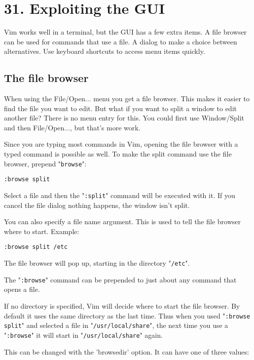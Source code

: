 \section{31. Exploiting the GUI}
Vim works well in a terminal, but the GUI has a few extra items.  A file
browser can be used for commands that use a file.  A dialog to make a choice
between alternatives.  Use keyboard shortcuts to access menu items quickly.
\subsection{The file browser}
When using the File/Open... menu you get a file browser.
This makes it easier to find the file you want to edit.
But what if you want to split a window to edit another file?  There is no menu entry for this.
You could first use Window/Split and then File/Open..., but that's more work.

Since you are typing most commands in Vim, opening the file browser with a typed command is possible as well.
To make the split command use the file browser, prepend "\verb!browse!":

\begin{Verbatim}[samepage=true]
 :browse split
\end{Verbatim}

Select a file and then the "\verb!:split!" command will be executed with it.
If you cancel the file dialog nothing happens, the window isn't split.

You can also specify a file name argument.
This is used to tell the file browser where to start.
Example:

\begin{Verbatim}[samepage=true]
 :browse split /etc
\end{Verbatim}

The file browser will pop up, starting in the directory "\verb!/etc!".

The "\verb!:browse!" command can be prepended to just about any command that opens a file.

If no directory is specified, Vim will decide where to start the file browser.
By default it uses the same directory as the last time.
Thus when you used "\verb!:browse split!" and selected a file in "\verb!/usr/local/share!", the next time you use a "\verb!:browse!" it will start in "\verb!/usr/local/share!" again.

This can be changed with the 'browsedir' option.  It can have one of three values:

